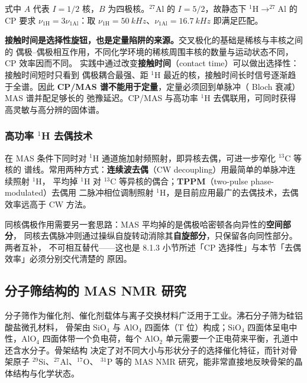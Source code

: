 式中 $A$ 代表 $I=1/2$ 核，$B$ 为四极核。$^{27}$Al 的 $I=5/2$，故静态下 $^{1}$H$\rightarrow
^{27}$Al 的 CP 要求 $\nu_{1\mathrm{H}}=3\nu_{1\mathrm{Al}}$：取 $\nu_{1\mathrm{H}}=
\qty{50}{kHz}$、$\nu_{1\mathrm{Al}}=\qty{16.7}{kHz}$ 即满足匹配。

\begin{measure}
\textbf{接触时间是选择性旋钮，也是定量陷阱的来源。}交叉极化的基础是稀核与丰核之间的
偶极--偶极相互作用，不同化学环境的稀核周围丰核的数量与运动状态不同，CP 效率因而不同。
实践中通过改变\textbf{接触时间}（contact time）可以做出选择性：接触时间短时只看到
偶极耦合最强、距 $^{1}$H 最近的核，接触时间长时信号逐渐趋于全谱。因此
\textbf{CP/MAS 谱不能用于定量}，定量必须回到单脉冲（ Bloch 衰减）MAS 谱并配足够长的
弛豫延迟。CP/MAS 与高功率 $^{1}$H 去偶联用，可同时获得高灵敏与高分辨的固体谱。
\end{measure}

\subsubsection{高功率 $^{1}$H 去偶技术}

在 MAS 条件下同时对 $^{1}$H 通道施加射频照射，即异核去偶，可进一步窄化 $^{13}$C 等核的
谱线。常用两种方式：\textbf{连续波去偶}（CW decoupling）用最简单的单脉冲连续照射 $^{1}$H，
平均掉 $^{1}$H 对 $^{13}$C 等异核的偶合；\textbf{TPPM}（two-pulse phase-modulated）去偶用
二脉冲相位调制照射 $^{1}$H，是目前应用最广的去偶技术，去偶效率远高于 CW 方法。

同核偶极作用需要另一套思路：MAS 平均掉的是偶极哈密顿各向异性的\textbf{空间部分}，
同核去偶脉冲则通过操纵自旋转动消除其\textbf{自旋部分}，只保留各向同性部分。两者互补，
不可相互替代——这也是 8.1.3 小节所述「CP 选择性」与本节「去偶效率」必须分别交代清楚的
原因。

\subsection{分子筛结构的 MAS NMR 研究}

分子筛作为催化剂、催化剂载体与离子交换材料广泛用于工业。沸石分子筛为硅铝酸盐微孔材料，
骨架由 SiO$_{4}$ 与 AlO$_{4}$ 四面体（T 位）构成；SiO$_{4}$ 四面体呈电中性，AlO$_{4}$
四面体带一个负电荷，每个 AlO$_{2}$ 单元需要一个正电荷来平衡，孔道中还含水分子。骨架结构
决定了对不同大小与形状分子的选择催化特征，而针对骨架原子 $^{29}$Si、$^{27}$Al、$^{17}$O、
$^{31}$P 等的 MAS NMR 研究，能非常直接地反映骨架的晶体结构与化学状态。

